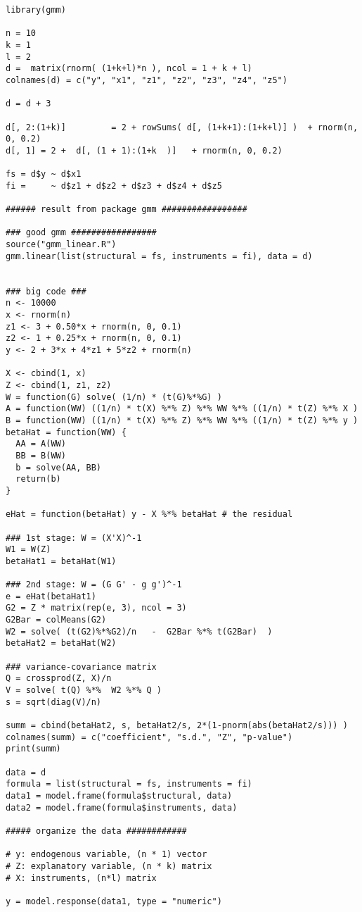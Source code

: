 \documentclass{article}
\begin{document}
\begin{verbatim}
library(gmm)

n = 10
k = 1
l = 2
d =  matrix(rnorm( (1+k+l)*n ), ncol = 1 + k + l)
colnames(d) = c("y", "x1", "z1", "z2", "z3", "z4", "z5")

d = d + 3

d[, 2:(1+k)]         = 2 + rowSums( d[, (1+k+1):(1+k+l)] )  + rnorm(n, 0, 0.2)
d[, 1] = 2 +  d[, (1 + 1):(1+k  )]   + rnorm(n, 0, 0.2)

fs = d$y ~ d$x1 
fi =     ~ d$z1 + d$z2 + d$z3 + d$z4 + d$z5

###### result from package gmm #################

### good gmm #################
source("gmm_linear.R")
gmm.linear(list(structural = fs, instruments = fi), data = d)


### big code ###
n <- 10000
x <- rnorm(n)
z1 <- 3 + 0.50*x + rnorm(n, 0, 0.1)
z2 <- 1 + 0.25*x + rnorm(n, 0, 0.1)
y <- 2 + 3*x + 4*z1 + 5*z2 + rnorm(n)

X <- cbind(1, x)
Z <- cbind(1, z1, z2)
W = function(G) solve( (1/n) * (t(G)%*%G) )
A = function(WW) ((1/n) * t(X) %*% Z) %*% WW %*% ((1/n) * t(Z) %*% X )
B = function(WW) ((1/n) * t(X) %*% Z) %*% WW %*% ((1/n) * t(Z) %*% y )
betaHat = function(WW) {
  AA = A(WW)
  BB = B(WW)
  b = solve(AA, BB)
  return(b)
}

eHat = function(betaHat) y - X %*% betaHat # the residual

### 1st stage: W = (X'X)^-1
W1 = W(Z)
betaHat1 = betaHat(W1)

### 2nd stage: W = (G G' - g g')^-1
e = eHat(betaHat1)
G2 = Z * matrix(rep(e, 3), ncol = 3)
G2Bar = colMeans(G2)
W2 = solve( (t(G2)%*%G2)/n   -  G2Bar %*% t(G2Bar)  )
betaHat2 = betaHat(W2)

### variance-covariance matrix
Q = crossprod(Z, X)/n
V = solve( t(Q) %*%  W2 %*% Q )
s = sqrt(diag(V)/n)

summ = cbind(betaHat2, s, betaHat2/s, 2*(1-pnorm(abs(betaHat2/s))) )
colnames(summ) = c("coefficient", "s.d.", "Z", "p-value")
print(summ)

data = d
formula = list(structural = fs, instruments = fi)
data1 = model.frame(formula$structural, data)
data2 = model.frame(formula$instruments, data)

##### organize the data ############

# y: endogenous variable, (n * 1) vector
# Z: explanatory variable, (n * k) matrix
# X: instruments, (n*l) matrix

y = model.response(data1, type = "numeric")


\end{verbatim}
\end{document}
